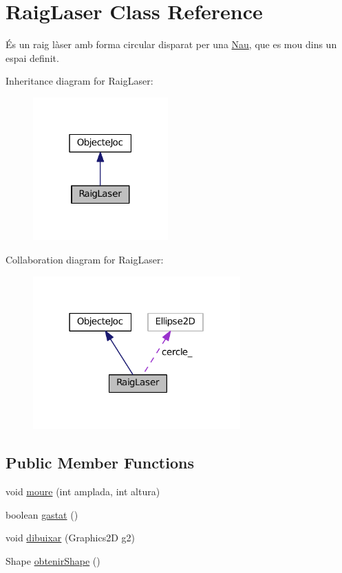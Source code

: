 \hypertarget{class_raig_laser}{}\section{Raig\+Laser Class Reference}
\label{class_raig_laser}


És un raig làser amb forma circular disparat per una \hyperlink{class_nau}{Nau}, que es mou dins un espai definit.  




Inheritance diagram for Raig\+Laser\+:\nopagebreak
\begin{figure}[H]
\begin{center}
\leavevmode
\includegraphics[width=147pt]{class_raig_laser__inherit__graph}
\end{center}
\end{figure}


Collaboration diagram for Raig\+Laser\+:\nopagebreak
\begin{figure}[H]
\begin{center}
\leavevmode
\includegraphics[width=226pt]{class_raig_laser__coll__graph}
\end{center}
\end{figure}
\subsection*{Public Member Functions}
\begin{DoxyCompactItemize}
\item 
void \hyperlink{class_raig_laser_af35092ef77217fb1aa4ff956cc5dfa55}{moure} (int amplada, int altura)
\item 
boolean \hyperlink{class_raig_laser_a66023f2dfc49d5b4ff859804736c090e}{gastat} ()
\item 
void \hyperlink{class_raig_laser_ac5b68f8063e239ae947a7ed728614799}{dibuixar} (Graphics2\+D g2)
\item 
Shape \hyperlink{class_raig_laser_abcf16e8249b1e7562d6fbcc6d408e7f4}{obtenir\+Shape} ()
\end{DoxyCompactItemize}
